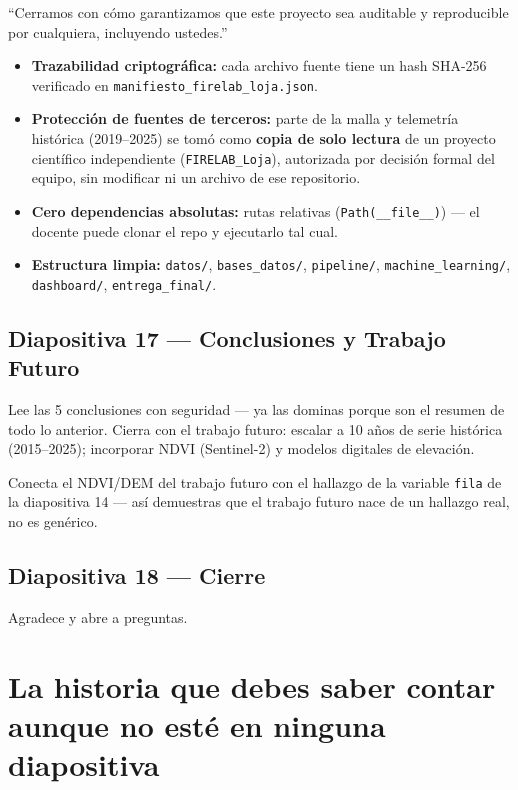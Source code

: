 \documentclass[11pt,a4paper]{article}
\begin{document}
\begin{decirbox}
``Cerramos con c\'omo garantizamos que este proyecto sea auditable y reproducible por cualquiera, incluyendo ustedes.''
\begin{itemize}
    \item \textbf{Trazabilidad criptogr\'afica:} cada archivo fuente tiene un hash SHA-256 verificado en \texttt{manifiesto\_firelab\_loja.json}.
    \item \textbf{Protecci\'on de fuentes de terceros:} parte de la malla y telemetr\'ia hist\'orica (2019--2025) se tom\'o como \textbf{copia de solo lectura} de un proyecto cient\'ifico independiente (\texttt{FIRELAB\_Loja}), autorizada por decisi\'on formal del equipo, sin modificar ni un archivo de ese repositorio.
    \item \textbf{Cero dependencias absolutas:} rutas relativas (\texttt{Path(\_\_file\_\_)}) --- el docente puede clonar el repo y ejecutarlo tal cual.
    \item \textbf{Estructura limpia:} \texttt{datos/}, \texttt{bases\_datos/}, \texttt{pipeline/}, \texttt{machine\_learning/}, \texttt{dashboard/}, \texttt{entrega\_final/}.
\end{itemize}
\end{decirbox}

\subsection{Diapositiva 17 --- Conclusiones y Trabajo Futuro}

Lee las 5 conclusiones con seguridad --- ya las dominas porque son el resumen de todo lo anterior. Cierra con el trabajo futuro: escalar a 10 a\~nos de serie hist\'orica (2015--2025); incorporar NDVI (Sentinel-2) y modelos digitales de elevaci\'on.

\begin{datobox}
Conecta el NDVI/DEM del trabajo futuro con el hallazgo de la variable \texttt{fila} de la diapositiva 14 --- as\'i demuestras que el trabajo futuro nace de un hallazgo real, no es gen\'erico.
\end{datobox}

\subsection{Diapositiva 18 --- Cierre}
Agradece y abre a preguntas.

\newpage
\section{La historia que debes saber contar aunque no est\'e en ninguna diapositiva}
\label{sec:historia_viirs}
\end{document}
